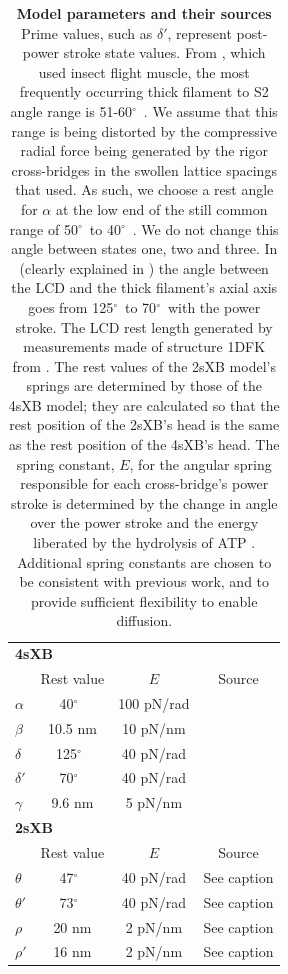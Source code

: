 \documentclass[]{article}
\newcommand{\de}{$^\circ$~} %
\begin{document}
\begin{table}[ft]
    \begin{center}
    \begin{tabular}[t]{|l|ccc|} \hline
    \multicolumn{4}{|l|}{\textbf{4sXB}} \\ 
    \multicolumn{1}{|l}{~} 
              & Rest value & $E$        & Source \\ \cline{2-4}  
    $\alpha$  & 40\de      & 100 pN/rad & \citet{Liu2006}      \\
    $\beta$   & 10.5 nm    & 10 pN/nm   & \citet{Liu2006}      \\
    $\delta$  & 125\de     & 40 pN/rad  & \citet{Taylor1999}   \\
    $\delta'$ & 70\de      & 40 pN/rad  & \citet{Taylor1999}   \\
    $\gamma$  & 9.6 nm     & 5 pN/nm    & \citet{Houdusse2000} \\ \hline
    \multicolumn{4}{|l|}{\textbf{2sXB}} \\ 
    \multicolumn{1}{|l}{~} 
              & Rest value & $E$        & Source      \\ \cline{2-4} 
    $\theta$  & 47\de      & 40 pN/rad  & See caption \\
    $\theta'$ & 73\de      & 40 pN/rad  & See caption \\
    $\rho$    & 20 nm      & 2 pN/nm    & See caption \\
    $\rho'$   & 16 nm      & 2 pN/nm    & See caption \\ \hline
    \end{tabular}
    \end{center}
    \caption{ 
    \label{parameter_table}
    \textbf{Model parameters and their sources} 
    Prime values, such as $\delta'$, represent post-power stroke state values. 
    From \citet{Liu2006}, which used insect flight muscle, the most frequently occurring thick filament to S2 angle range is 51-60\de. 
    We assume that this range is being distorted by the compressive radial force being generated by the rigor cross-bridges in the swollen lattice spacings that \citet{Liu2006} used. 
    As such, we choose a rest angle for $\alpha$ at the low end of the still common range of 50\de to 40\de. 
    We do not change this angle between states one, two and three.
    In \citet{Taylor1999} (clearly explained in \citet{Davis2009}) the angle between the LCD and the thick filament's axial axis goes from 125\de to 70\de with the power stroke. 
    The LCD rest length generated by measurements made of structure 1DFK from \citet{Houdusse2000}. 
    The rest values of the 2sXB model's springs are determined by those of the 4sXB model; they are calculated so that the rest position of the 2sXB's head is the same as the rest position of the 4sXB's head. 
    The spring constant, $E$, for the angular spring responsible for each cross-bridge's power stroke is determined by the change in angle over the power stroke and the energy liberated by the hydrolysis of ATP \citep{Tanner2007}. 
    Additional spring constants are chosen to be consistent with previous work, and to provide sufficient flexibility to enable diffusion. 
    }
\end{table}
\end{document}
